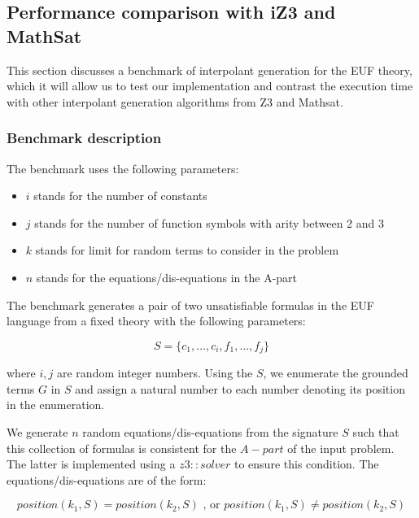 \subsection{Performance comparison with iZ3 and MathSat}\label{performance_euf}

This section discusses a benchmark of interpolant generation
for the EUF theory, which it will allow us to test 
our implementation and contrast the execution 
time with other interpolant generation
algorithms from Z3 and Mathsat.

\subsubsection{Benchmark description}

The benchmark uses the following parameters:

\begin{itemize}
  \item $i$ stands for the number of constants
  \item $j$ stands for the number of function symbols
    with arity between 2 and 3
  \item $k$ stands for limit for random terms to consider
    in the problem
  \item $n$ stands for the equations/dis-equations in the
    A-part
\end{itemize}

The benchmark generates a pair of two unsatisfiable formulas
in the EUF language from a fixed theory with the following parameters:

\begin{equation*}
  S = \{ c_1, \dots, c_i, f_1, \dots, f_j \}
\end{equation*}

where $i, j$ are random integer numbers. Using the $S$, we
enumerate the grounded terms $G$ in $S$ and assign a natural 
number to each number denoting its position in the enumeration.

We generate $n$ random equations/dis-equations from the signature $S$ 
such that this
collection of formulas is consistent for the $A-part$ of
the input problem. 
The latter is implemented using a $z3: :solver$ to ensure 
this condition.
The equations/dis-equations are of the form:

\begin{equation*}
  position(k_1, S) = position(k_2, S) \text{ , or } position(k_1, S) \neq position(k_2, S) 
\end{equation*}

